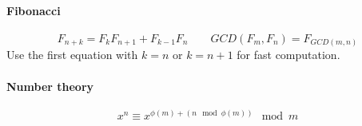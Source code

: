 \documentclass{article}
\begin{document}
	\paragraph{Fibonacci}
	$$ F_{n+k} = F_k F_{n+1} + F_{k-1} F_n \qquad GCD(F_m, F_n) = F_{GCD(m, n)} $$
	Use the first equation with $k=n$ or $k=n+1$ for fast computation.
	\paragraph{Number theory}
	$$ x^n \equiv x^{\phi(m) + \left( n \!\!\!\mod \phi(m) \right)} \mod m $$
\end{document}
